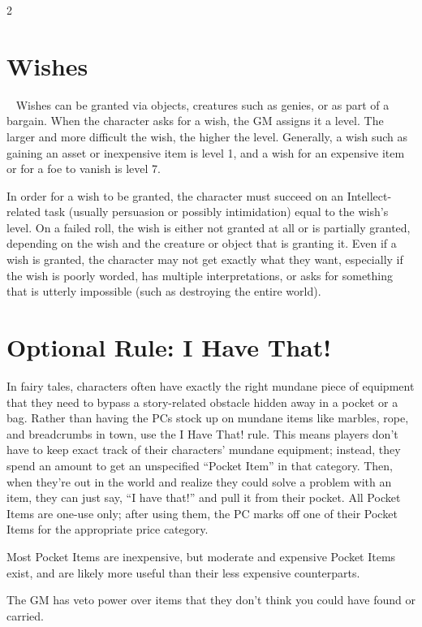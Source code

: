 \begin{multicols}{2}

\section{Wishes}
 
Wishes can be granted via objects, creatures such as genies, or as part of a bargain. When the character asks for a wish, the GM assigns it a level. The larger and more difficult the wish, the higher the level. Generally, a wish such as gaining an asset or inexpensive item is level 1, and a wish for an expensive item or for a foe to vanish is level 7.

In order for a wish to be granted, the character must succeed on an Intellect-related task (usually persuasion or possibly intimidation) equal to the wish’s level. On a failed roll, the wish is either not granted at all or is partially granted, depending on the wish and the creature or object that is granting it.
Even if a wish is granted, the character may not get exactly what they want, especially if the wish is poorly worded, has multiple interpretations, or asks for something that is utterly impossible (such as destroying the entire world).

\section{Optional Rule: I Have That!}

In fairy tales, characters often have exactly the right mundane piece of equipment that they need to bypass a story-related obstacle hidden away in a pocket or a bag. Rather than having the PCs stock up on mundane items like marbles, rope, and breadcrumbs in town, use the I Have That! rule. This means players don’t have to keep exact track of their characters’ mundane equipment; instead, they spend an amount to get an unspecified “Pocket Item” in
that category. Then, when they’re out in the world and realize they could solve a problem with an item, they can just say, “I have that!” and pull it from their pocket. All Pocket Items are one-use only; after using them, the PC marks off one of their Pocket Items for the appropriate price category.

Most Pocket Items are inexpensive, but moderate and expensive Pocket Items exist, and are likely more useful than their less expensive counterparts.

The GM has veto power over items that they don’t think you could have found or carried.


\end{multicols}
